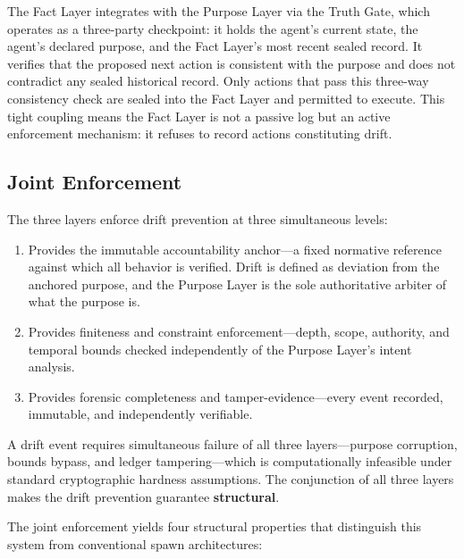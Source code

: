 The Fact Layer integrates with the Purpose Layer via the Truth Gate, which operates as a three-party checkpoint: it holds the agent's current state, the agent's declared purpose, and the Fact Layer's most recent sealed record. It verifies that the proposed next action is consistent with the purpose and does not contradict any sealed historical record. Only actions that pass this three-way consistency check are sealed into the Fact Layer and permitted to execute. This tight coupling means the Fact Layer is not a passive log but an active enforcement mechanism: it refuses to record actions constituting drift.

\subsection{Joint Enforcement}

The three layers enforce drift prevention at three simultaneous levels:

\begin{enumerate}
  \item[\textbf{Logical level (Purpose Layer):}] Provides the immutable accountability anchor---a fixed normative reference against which all behavior is verified. Drift is defined as deviation from the anchored purpose, and the Purpose Layer is the sole authoritative arbiter of what the purpose is.
  \item[\textbf{Structural level (Bounds Engine):}] Provides finiteness and constraint enforcement---depth, scope, authority, and temporal bounds checked independently of the Purpose Layer's intent analysis.
  \item[\textbf{Archival level (Fact Layer):}] Provides forensic completeness and tamper-evidence---every event recorded, immutable, and independently verifiable.
\end{enumerate}

A drift event requires simultaneous failure of all three layers---purpose corruption, bounds bypass, and ledger tampering---which is computationally infeasible under standard cryptographic hardness assumptions. The conjunction of all three layers makes the drift prevention guarantee \textbf{structural}.

The joint enforcement yields four structural properties that distinguish this system from conventional spawn architectures:

